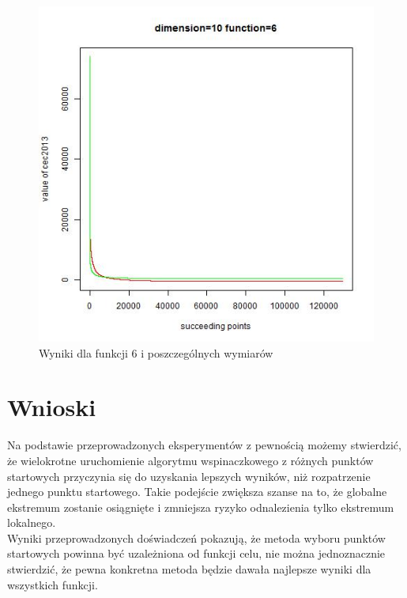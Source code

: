 \documentclass{article}
\begin{document}
\begin{figure}[!htb]
\endminipage\hfill
\includegraphics[scale=0.40]{dim_10__func_6}
\caption{Wyniki dla funkcji 6 i poszczególnych wymiarów}
\end{figure}
\newpage

\section{Wnioski}

Na podstawie przeprowadzonych eksperymentów z pewnością możemy stwierdzić, że wielokrotne uruchomienie algorytmu wspinaczkowego z różnych punktów startowych przyczynia się do uzyskania lepszych wyników, niż rozpatrzenie jednego punktu startowego. Takie podejście zwiększa szanse na to, że globalne ekstremum zostanie osiągnięte i zmniejsza ryzyko odnalezienia tylko ekstremum lokalnego.\\
Wyniki przeprowadzonych doświadczeń pokazują, że metoda wyboru punktów startowych powinna być uzależniona od funkcji celu, nie można jednoznacznie stwierdzić, że pewna konkretna metoda będzie dawała najlepsze wyniki dla wszystkich funkcji.
\end{document}

